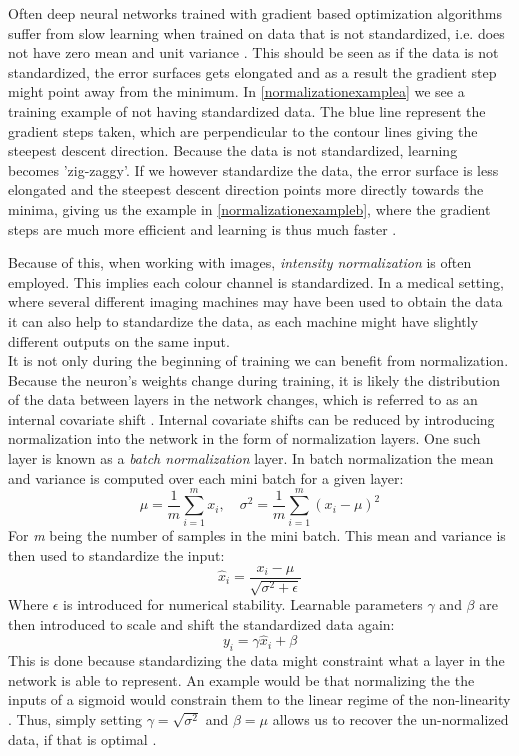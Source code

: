 Often deep neural networks trained with gradient based optimization algorithms suffer from slow learning when trained on data that is not standardized, i.e. does not have zero mean and unit variance \cite{normalization}. This should be seen as if the data is not standardized, the error surfaces gets elongated and as a result the gradient step might point away from the minimum. In \autoref{normalizationexamplea} we see a training example of not having standardized data. The blue line represent the gradient steps taken, which are perpendicular to the contour lines giving the steepest descent direction. Because the data is not standardized, learning becomes 'zig-zaggy'. If we however standardize the data, the error surface is less elongated and the steepest descent direction points more directly towards the minima, giving us the example in \autoref{normalizationexampleb}, where the gradient steps are much more efficient and learning is thus much faster \cite{errorsurface}.

Because of this, when working with images, \textit{intensity normalization} is often employed. This implies each colour channel is standardized. In a medical setting, where several different imaging machines may have been used to obtain the data it can also help to standardize the data, as each machine might have slightly different outputs on the same input.\\
It is not only during the beginning of training we can benefit from normalization. Because the neuron's weights change during training, it is likely the distribution of the data between layers in the network changes, which is referred to as an internal covariate shift \cite{batchnormalization}. Internal covariate shifts can be reduced by introducing normalization into the network in the form of normalization layers. One such layer is known as a \textit{batch normalization} layer. In batch normalization the mean and variance is computed over each mini batch for a given layer:
\begin{equation*}
	\mu = \frac{1}{m}\sum_{i=1}^{m}x_i,\quad \sigma^2 = \frac{1}{m}\sum_{i=1}^{m}(x_i - \mu)^2
\end{equation*}
For \textit{m} being the number of samples in the mini batch. This mean and variance is then used to standardize the input:
\begin{equation*}
	\hat{x}_i = \frac{x_i - \mu}{\sqrt{\sigma^2+\epsilon}}
\end{equation*}
Where $\epsilon$ is introduced for numerical stability. Learnable parameters $\gamma$ and $\beta$ are then introduced to scale and shift the standardized data again:
\begin{equation*}
	y_i = \gamma\hat{x}_i + \beta
\end{equation*}
This is done because standardizing the data might constraint what a layer in the network is able to represent. An example would be that normalizing the the inputs of a sigmoid would constrain them to the linear regime of the non-linearity \cite{batchnormalization}. Thus, simply setting $\gamma = \sqrt{\sigma^2}$ and $\beta = \mu$ allows us to recover the un-normalized data, if that is optimal \cite{errorsurface}\cite{batchnormalization}.